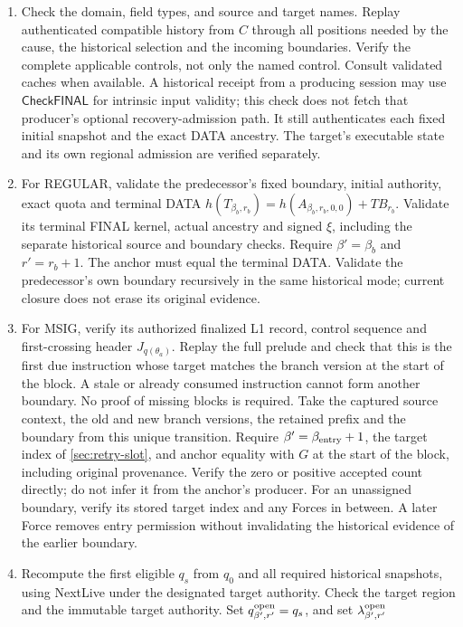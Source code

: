 \documentclass[11pt,a4paper]{article}
\newcommand{\TB}{\mathit{TB}}
\newcommand{\tagg}[1]{\ensuremath{\mathsf{#1}}}
\begin{document}
\begin{enumerate}[label=(\roman*),itemsep=2pt]
\item Check the domain, field types, and source and target names. Replay
authenticated compatible history from $C$ through all positions needed by
the cause, the historical selection and the incoming boundaries. Verify
the complete applicable controls, not only the named control. Consult
validated caches when available. A historical receipt from a producing
session may use \tagg{CheckFINAL} for intrinsic input validity; this check
does not fetch that producer's optional recovery-admission path. It still
authenticates each fixed initial snapshot and the exact DATA ancestry. The
target's executable state and its own regional admission are verified
separately.
\item For REGULAR, validate the predecessor's fixed boundary, initial
authority, exact quota and terminal DATA
$h(T_{\beta_b,r_b})=h(A_{\beta_b,r_b,0,0})+\TB_{r_b}$. Validate its terminal
FINAL kernel, actual ancestry and signed $\xi$, including the separate
historical source and boundary checks. Require $\beta'=\beta_b$ and
$r'=r_b+1$. The anchor must equal the terminal DATA. Validate the
predecessor's own boundary recursively in the same historical mode;
current closure does not erase its original evidence.
\item For MSIG, verify its authorized finalized L1 record, control
sequence and first-crossing header $J_{q(\theta_a)}$. Replay the full
prelude and check that this is the first due instruction whose target
matches the branch version at the start of the block. A stale or already
consumed instruction cannot form another boundary. No proof of missing
blocks is required. Take the captured source context, the old and new
branch versions, the retained prefix and the boundary from this unique
transition. Require $\beta'=\beta_{\rm entry}+1$, the target index of
\cref{sec:retry-slot}, and anchor equality with $G$ at the start of the
block, including original provenance. Verify the zero or positive
accepted count directly; do not infer it from the anchor's producer. For
an unassigned boundary, verify its stored target index and any Forces in
between. A later Force removes entry permission without invalidating the
historical evidence of the earlier boundary.
\item Recompute the first eligible $q_s$ from $q_0$ and all required
historical snapshots, using NextLive under the designated target
authority. Check the target region and the immutable target authority.
Set $q^{\rm open}_{\beta',r'}=q_s$, and set $\lambda^{\rm open}_{\beta',r'}$

\end{enumerate}
\end{document}
